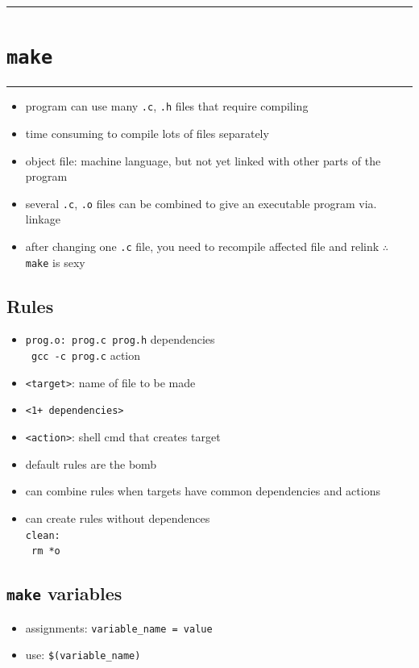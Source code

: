 \documentclass[10pt, multicolumn, a4paper]{article}
\begin{document}
\setcounter{section}{3}
\hrule
\section{\texttt{make}}
\hrule 

\begin{multicols}{2}
	\begin{itemize}
	\item program can use many \verb|.c|, \verb|.h| files that require compiling
	\item time consuming to compile lots of files separately
	\item object file: machine language, but not yet linked with other parts of the program
	\item several \verb|.c|,  \verb|.o| files can be combined to give an executable program via. linkage
	\item after changing one \verb|.c| file, you need to recompile affected file and relink $\therefore$ \verb|make| is sexy
	\end{itemize}
	\subsection*{Rules}
	\begin{itemize}
	\item \verb|prog.o: prog.c prog.h| \hspace*{5mm} dependencies 
		\\ \texttt{\hspace*{5mm} gcc -c prog.c} \hspace*{13mm} action
	\item \verb|<target>|: name of file to be made
	\item \verb|<1+ dependencies>|%
	\item \verb|<action>|: shell cmd that creates target
	\item default rules are the bomb
	\item can combine rules when targets have common dependencies and actions
	\item can create rules without dependences
		\\ \verb|clean:| \\ \texttt{\hspace*{5mm} rm *o}
	\end{itemize}
	
	\newpage	
	
	\subsection*{\texttt{make} variables}
	\begin{itemize}
	\item assignments: \verb|variable_name = value|
	\item use: \verb|$(variable_name)|
	\end{itemize}

\end{multicols}
\end{document}
